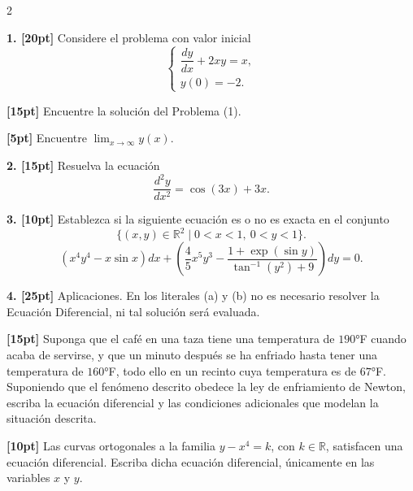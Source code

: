 \documentclass[11pt]{article}
\begin{document}
\begin{multicols}{2}

\textbf{1. [20pt]} Considere el problema con valor inicial
\[
\begin{cases}
\dfrac{dy}{dx}+2xy=x, \\[4pt]
y(0)=-2.
\end{cases}
\tag{1}
\]

\begin{opciones}
\item[(a)] \textbf{[15pt]} Encuentre la solución del Problema (1).

\vspace{3cm}

\item[(b)] \textbf{[5pt]} Encuentre $\displaystyle\lim_{x\to\infty} y(x)$.

\vspace{2.5cm}
\end{opciones}

\textbf{2. [15pt]} Resuelva la ecuación
\[
\frac{d^2y}{dx^2}=\cos(3x)+3x.
\]

\vspace{4cm}

\columnbreak

\textbf{3. [10pt]} Establezca si la siguiente ecuación es o no es exacta en el conjunto
\[
\{(x,y)\in\mathbb{R}^2 \mid 0<x<1,\ 0<y<1\}.
\]
\[
\left(x^4y^4-x\sin x\right)dx+\left(\frac{4}{5}x^5y^3-\frac{1+\exp(\sin y)}{\tan^{-1}(y^2)+9}\right)dy=0.
\]

\vspace{4cm}

\textbf{4. [25pt]} Aplicaciones. En los literales (a) y (b) no es necesario resolver la Ecuación Diferencial, ni tal solución será evaluada.

\begin{opciones}
\item[(a)] \textbf{[15pt]} Suponga que el café en una taza tiene una temperatura de $190$°F cuando acaba de servirse, y que un minuto después se ha enfriado hasta tener una temperatura de $160$°F, todo ello en un recinto cuya temperatura es de $67$°F. Suponiendo que el fenómeno descrito obedece la ley de enfriamiento de Newton, escriba la ecuación diferencial y las condiciones adicionales que modelan la situación descrita.

\vspace{2.5cm}

\item[(b)] \textbf{[10pt]} Las curvas ortogonales a la familia $y-x^4=k$, con $k\in\mathbb{R}$, satisfacen una ecuación diferencial. Escriba dicha ecuación diferencial, únicamente en las variables $x$ y $y$.

\vspace{2.5cm}
\end{opciones}

\end{multicols}
\end{document}
